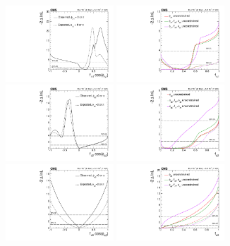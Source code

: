\begin{figure}
\centering
       \includegraphics[width=0.36\textwidth]{Spin_Parity/fL1_Real.pdf}
       \includegraphics[width=0.36\textwidth]{Spin_Parity/fL1_Profile.pdf} \\
       \includegraphics[width=0.36\textwidth]{Spin_Parity/fa2_Real.pdf}
       \includegraphics[width=0.36\textwidth]{Spin_Parity/fa2_Profile.pdf} \\
       \includegraphics[width=0.36\textwidth]{Spin_Parity/fa3_Real.pdf}
       \includegraphics[width=0.36\textwidth]{Spin_Parity/fa3_Profile.pdf}

\end{figure}
